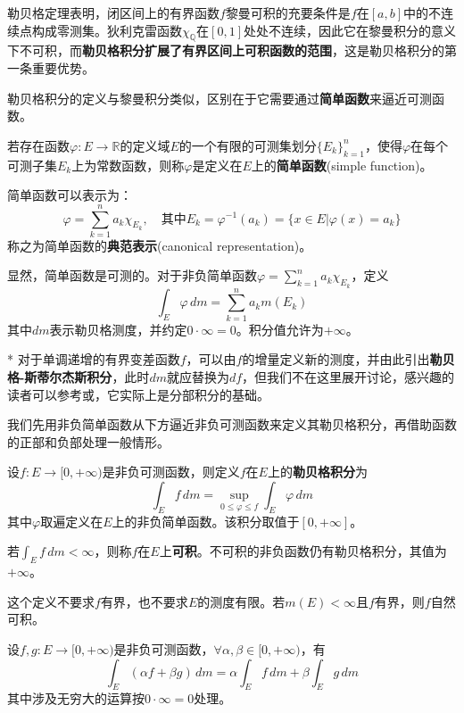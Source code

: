 勒贝格定理\cite{real_analysis}表明，闭区间上的有界函数$f$黎曼可积的充要条件是$f$在$[a,b]$中的不连续点构成零测集。狄利克雷函数$\chi_{\mathbb{Q}}$在$[0,1]$处处不连续，因此它在黎曼积分的意义下不可积，而\textbf{勒贝格积分扩展了有界区间上可积函数的范围}，这是勒贝格积分的第一条重要优势。

勒贝格积分的定义与黎曼积分类似，区别在于它需要通过\textbf{简单函数}来逼近可测函数。

\begin{definition}[简单函数]
    若存在函数$\varphi:E\to\mathbb{R}$的定义域$E$的一个有限的可测集划分$\{E_k\}_{k=1}^{n}$，使得$\varphi$在每个可测子集$E_k$上为常数函数，则称$\varphi$是定义在$E$上的\textbf{简单函数}(simple function)。

    简单函数可以表示为：
    \[\varphi=\sum_{k=1}^{n}a_k\chi_{E_k},\quad\text{其中}E_k=\varphi^{-1}(a_k)=\{x\in E|\varphi(x)=a_k\}\]
    称之为简单函数的\textbf{典范表示}(canonical representation)。
\end{definition}

显然，简单函数是可测的。对于非负简单函数$\varphi=\sum_{k=1}^{n}a_k\chi_{E_k}$，定义
\[\int_{E}\varphi\,dm=\sum_{k=1}^{n}a_k m(E_k)\]
其中$dm$表示勒贝格测度，并约定$0\cdot\infty=0$。积分值允许为$+\infty$。
\begin{remark}*
    对于单调递增的有界变差函数$f$，可以由$f$的增量定义新的测度，并由此引出\textbf{勒贝格-斯蒂尔杰斯积分}，此时$dm$就应替换为$df$，但我们不在这里展开讨论，感兴趣的读者可以参考\cite{simple_real_analysis}或\cite{chentianquan}，它实际上是分部积分的基础。
\end{remark}

我们先用非负简单函数从下方逼近非负可测函数来定义其勒贝格积分，再借助函数的正部和负部处理一般情形。

\begin{definition}[非负可测函数的勒贝格积分]
    设$f:E\to[0,+\infty)$是非负可测函数，则定义$f$在$E$上的\textbf{勒贝格积分}为
    \[\int_{E}f\,dm=\sup_{0\leq \varphi\leq f}\int_{E}\varphi\,dm\]
    其中$\varphi$取遍定义在$E$上的非负简单函数。该积分取值于$[0,+\infty]$。

    若$\int_{E}f\,dm<\infty$，则称$f$在$E$上\textbf{可积}。不可积的非负函数仍有勒贝格积分，其值为$+\infty$。
\end{definition}

这个定义不要求$f$有界，也不要求$E$的测度有限。若$m(E)<\infty$且$f$有界，则$f$自然可积。

\begin{theorem}[非负可测函数的勒贝格积分的线性性]
    设$f,g:E\to[0,+\infty)$是非负可测函数，$\forall\alpha,\beta\in[0,+\infty)$，有
    \[\int_{E}(\alpha f+\beta g)\,dm=\alpha\int_{E}f\,dm+\beta\int_{E}g\,dm\]
    其中涉及无穷大的运算按$0\cdot\infty=0$处理。
\end{theorem}

